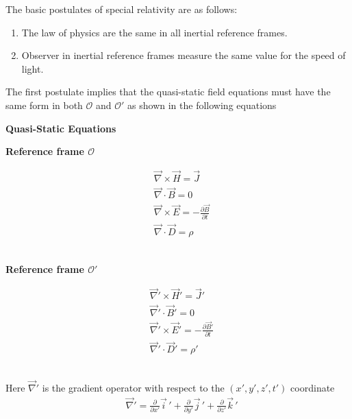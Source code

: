 \documentclass[11pt,a4paper,oneside]{book}
\numberwithin{equation}{section}
\theoremstyle{it}
\theoremstyle{definition}
\begin{document}
The basic postulates of special relativity are as follows:
\begin{enumerate}
	\item The law of physics are the same in all inertial reference frames.
	\item Observer in inertial reference frames measure the same value for the speed of light.
\end{enumerate}

The first postulate implies that the quasi-static field equations must have the same form in both  $\mathcal{O}$ and $\mathcal{O'}$ as shown in the following equations
\setlength{\columnseprule}{1pt}
\bigskip
\ \newline \centerline{\textbf{Quasi-Static Equations}}
\begin{multicols}{2}
	\centerline{\textbf{Reference frame $\mathcal{O}$}}	
	\begin{equation*}
		\begin{aligned}
			&\vec{\nabla}\times\vec{H} = \vec{J} \\[6pt]
			&\vec{\nabla}\cdot\vec{B} = 0 \\[6pt]
			&\vec{\nabla}\times\vec{E} = -\frac{\partial\vec{B}}{\partial t} \\[6pt]
			&\vec{\nabla}\cdot\vec{D} = \rho
		\end{aligned}
	\end{equation*} 
	\ \newline
	\columnbreak
	\ \newline
	\centerline{\textbf{Reference frame $\mathcal{O'}$}}	
\begin{equation}\label{maxwell_eq_moving_frame}
	\begin{aligned}
		&\vec{\nabla}'\times\vec{H}' = \vec{J}' \\[6pt]
		&\vec{\nabla}'\cdot\vec{B}' = 0 \\[6pt]
		&\vec{\nabla}'\times\vec{E}' = -\frac{\partial\vec{B}'}{\partial t} \\[6pt]
		&\vec{\nabla}'\cdot\vec{D}' = \rho'
	\end{aligned}
\end{equation} 
	\ \newline
\end{multicols}
Here $\vec{\nabla}'$ is the gradient operator with respect to the $(x',y',z',t')$ coordinate
\begin{equation*}
	\begin{aligned}
		&\vec{\nabla}'= \frac{\partial}{\partial x'}\vec{i}\,'+\frac{\partial}{\partial y'}\vec{j}\,'+\frac{\partial}{\partial z'}\vec{k}\,'
	\end{aligned}
\end{equation*} 
\end{document}
